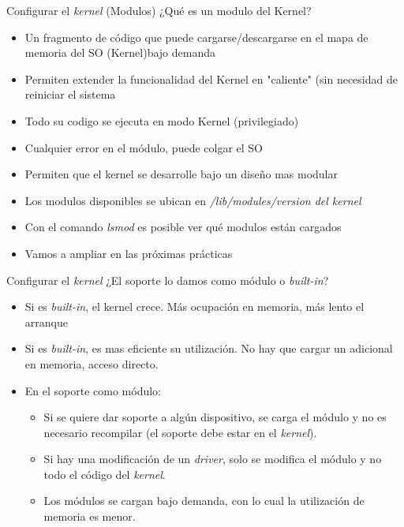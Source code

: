 \begin{frame}{Configurar el \textit{kernel} (Modulos)}
¿Qué es un modulo del Kernel?
\begin{itemize}
\item Un fragmento de código que puede cargarse/descargarse en el mapa de memoria del SO (Kernel)bajo demanda
\item Permiten extender la funcionalidad del Kernel en "caliente" (sin necesidad de reiniciar el sistema
\item Todo su codigo se ejecuta en modo Kernel (privilegiado)
\item Cualquier error en el módulo, puede colgar el SO
\item Permiten que el kernel se desarrolle bajo un diseño mas modular
\item Los modulos disponibles se ubican en \textit{/lib/modules/version del kernel}
\item Con el comando \textit{lsmod} es posible ver qué modulos están cargados
\item \alert{Vamos a ampliar en las próximas prácticas}
\end{itemize}
\end{frame}


\begin{frame}{Configurar el \textit{kernel}}
¿El soporte lo damos como módulo o \textit{built-in}?
\pause
\begin{itemize}
\item Si es \textit{built-in}, el kernel crece. Más ocupación en memoria, más lento el arranque
\item Si es \textit{built-in}, es mas eficiente su utilización. No hay que
  cargar un adicional en memoria, acceso directo.
\item En el soporte como módulo:
  \begin{itemize}
  \item Si se quiere dar soporte a algún dispositivo, se carga el módulo y
    no es necesario recompilar (el soporte debe estar en el
    \textit{kernel}).

  \item Si hay una modificación de un \textit{driver}, solo se modifica el
    módulo y no todo el código del \textit{kernel}.

  \item Los módulos se cargan bajo demanda, con lo cual la utilización de
    memoria es menor.
  \end{itemize}
\end{itemize}
\end{frame}

